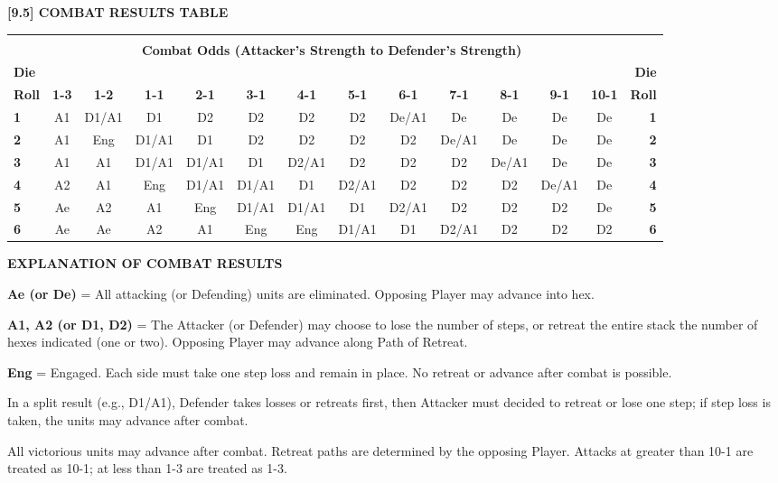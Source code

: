 \par

\textbf{[9.5] COMBAT RESULTS TABLE}

\begin{tabular}{|lccccccccccccr|}
  \hline & & & & & & & & & & & & &\\[-2.0ex]
  & & &\multicolumn{8}{c}{\textbf{Combat Odds (Attacker's Strength to Defender's Strength)}} & & &\\[-2.0ex]
  \textbf{Die} & & & & & & & & & & & & & \textbf{Die}\\
  \textbf{Roll} & \textbf{1-3} & \textbf{1-2} & \textbf{1-1} & \textbf{2-1} & \textbf{3-1} & \textbf{4-1} & \textbf{5-1} & \textbf{6-1} & \textbf{7-1} & \textbf{8-1} & \textbf{9-1} & \textbf{10-1} & \textbf{Roll}\\
  \rowcolor{lightgray}\textbf{1} & A1 & D1/A1 & D1 & D2 & D2 & D2 & D2 & De/A1 & De & De & De & De & \textbf{1}\\
  \textbf{2} & A1 & Eng & D1/A1 & D1 & D2 & D2 & D2 & D2 & De/A1 & De & De & De & \textbf{2}\\
  \rowcolor{lightgray}\textbf{3} & A1 & A1 & D1/A1 & D1/A1 & D1 & D2/A1 & D2 & D2 & D2 & De/A1 & De & De & \textbf{3}\\
  \textbf{4} & A2 & A1 & Eng & D1/A1 & D1/A1 & D1 & D2/A1 & D2 & D2 & D2 & De/A1 & De & \textbf{4}\\
  \rowcolor{lightgray}\textbf{5} & Ae & A2 & A1 & Eng & D1/A1 & D1/A1 & D1 & D2/A1 & D2 & D2 & D2 & De & \textbf{5}\\
  \textbf{6} & Ae & Ae & A2 & A1 & Eng & Eng & D1/A1 & D1 & D2/A1 & D2 & D2 & D2 & \textbf{6}\\
  \hline
\end{tabular}

\begin{flushleft}
  \textbf{EXPLANATION OF COMBAT RESULTS}
\end{flushleft}

\textbf{Ae (or De)} = All attacking (or Defending) units are eliminated. Opposing Player may advance into hex.
\par
\textbf{A1, A2 (or D1, D2)} = The Attacker (or Defender) may choose to lose the number of steps, or retreat the entire stack the number of hexes indicated (one or two). Opposing Player may advance along Path of Retreat.
\par
\textbf{Eng} = Engaged. Each side must take one step loss and remain in place. No retreat or advance after combat is possible.
\par
In a split result (e.g., D1/A1), Defender takes losses or retreats first, then Attacker must decided to retreat or lose one step; if step loss is taken, the units may advance after combat.
\par
All victorious units may advance after combat. Retreat paths are determined by the opposing Player. Attacks at greater than 10-1 are treated as 10-1; at less than 1-3 are treated as 1-3.